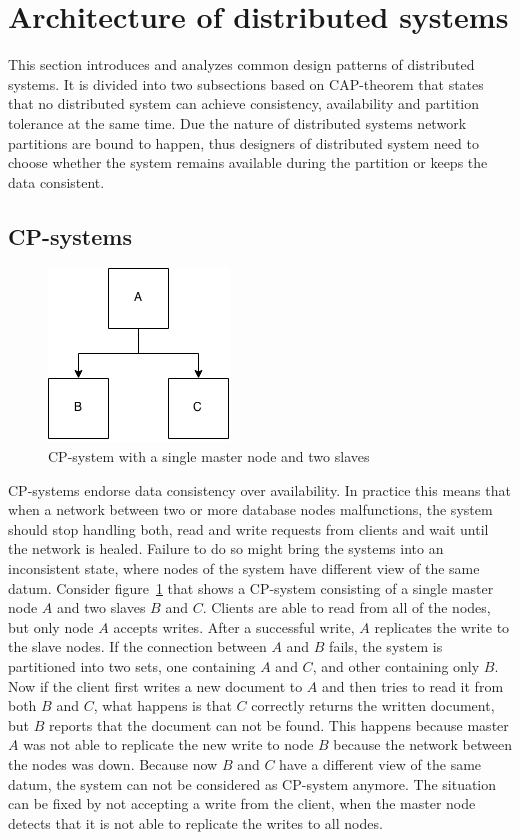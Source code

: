 \section{Architecture of distributed systems}

This section introduces and analyzes common design patterns of distributed
systems. It is divided into two subsections based on
CAP-theorem\cite{gilbert2002brewer} that states that no distributed system can
achieve consistency, availability and partition tolerance at the same time. Due
the nature of distributed systems network partitions are bound to happen, thus
designers of distributed system need to choose whether the system remains
available during the partition or keeps the data consistent.

\subsection{CP-systems}

\begin{figure}[h!]
  \centering
    \includegraphics{pictures/cp_system.png}
  \caption{CP-system with a single master node and two slaves}
\label{cpimage}
\end{figure}

CP-systems endorse data consistency over availability. In practice this means
that when a network between two or more database nodes malfunctions, the
system should stop handling both, read and write requests from clients and wait
until the network is healed. Failure to do so might bring the systems into an
inconsistent state, where nodes of the system have different view of the same
datum. Consider figure~\ref{cpimage} that shows a CP-system consisting of a
single master node \(A\) and two slaves \(B\) and \(C\). Clients are able to
read from all of the nodes, but only node \(A\) accepts writes. After a
successful write, \(A\) replicates the write to the slave nodes. If the
connection between \(A\) and \(B\) fails, the system is partitioned into two
sets, one containing \(A\) and \(C\), and other containing only \(B\). Now if
the client first writes a new document to \(A\) and then tries to read it from
both \(B\) and \(C\), what happens is that \(C\) correctly returns the written
document, but \(B\) reports that the document can not be found. This happens
because master \(A\) was not able to replicate the new write to node \(B\)
because the network between the nodes was down. Because now \(B\) and \(C\) have
a different view of the same datum, the system can not be considered as
CP-system anymore. The situation can be fixed by not accepting a write from the
client, when the master node detects that it is not able to replicate the writes
to all nodes. 

